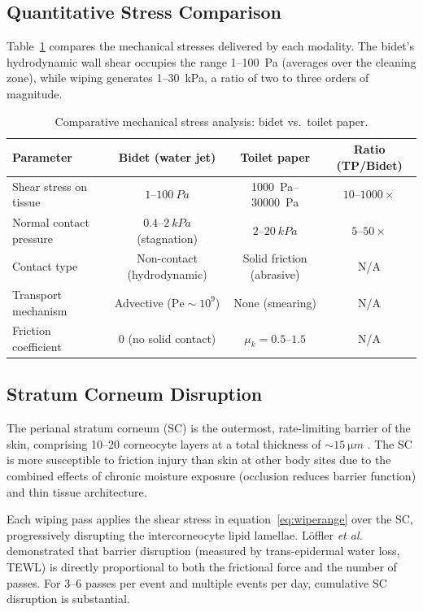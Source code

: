 \documentclass[aps,prfluids,reprint,amsmath,amssymb,floatfix]{revtex4-2}
\newcommand{\Pe}{\mathrm{Pe}}
\begin{document}
\subsection{Quantitative Stress Comparison}

Table~\ref{tab:stresscomparison} compares the mechanical stresses delivered
by each modality. The bidet's hydrodynamic wall shear occupies the range
1--\SI{100}{Pa} (averages over the cleaning zone), while wiping
generates 1--\SI{30}{kPa}, a ratio of two to three orders of
magnitude.

\begin{table}[h!]
\centering
\caption{Comparative mechanical stress analysis: bidet vs.\ toilet paper.}
\label{tab:stresscomparison}
\begin{tabular}{lccc}
\toprule
\textbf{Parameter} & \textbf{Bidet (water jet)} & \textbf{Toilet paper} & \textbf{Ratio (TP/Bidet)}\\
\midrule
Shear stress on tissue     & $1$--$\SI{100}{Pa}$    & \SI{1000}{Pa}--\SI{30000}{Pa} & $10$--$1000\times$\\
Normal contact pressure    & $0.4$--$\SI{2}{kPa}$ (stagnation) & $2$--$\SI{20}{kPa}$ & $5$--$50\times$\\
Contact type               & Non-contact (hydrodynamic) & Solid friction (abrasive) & N/A\\
Transport mechanism        & Advective ($\Pe \sim 10^9$)   & None (smearing)         & N/A\\
Friction coefficient       & $0$ (no solid contact) & $\mu_k = 0.5$--$1.5$   & N/A\\
\bottomrule
\end{tabular}
\end{table}

\subsection{Stratum Corneum Disruption}
\label{subsec:SC}

The perianal stratum corneum (SC) is the outermost, rate-limiting barrier
of the skin, comprising 10--20 corneocyte layers at a total thickness of
$\sim\SI{15}{\micro m}$ \citep{Loden2012}. The SC is more susceptible to
friction injury than skin at other body sites due to the combined effects
of chronic moisture exposure (occlusion reduces barrier function) and thin
tissue architecture.

Each wiping pass applies the shear stress in equation~\eqref{eq:wiperange}
over the SC, progressively disrupting the intercorneocyte lipid lamellae.
L\"offler \textit{et al.}\ \citep{Loffler2004} demonstrated that barrier
disruption (measured by trans-epidermal water loss, TEWL) is directly
proportional to both the frictional force and the number of passes.
For 3--6 passes per event and multiple events per day, cumulative SC
disruption is substantial.
\end{document}
